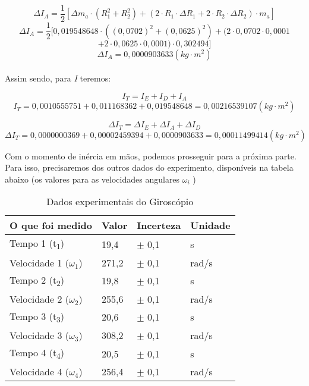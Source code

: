 \[\Delta I_A = \frac{1}{2} 
    \left[ 
        \Delta m_a \cdot (R_1^2 + R_2^2) + 
        \left( 2 \cdot R_1 \cdot \Delta R_1 + 2 \cdot R_2 \cdot \Delta R_2 \right) \cdot m_a
    \right]
\]
\[\Delta I_A = \frac{1}{2} 
    [ 
        0,019548648 \cdot ((0,0702)^2 + (0,0625)^2) + 
        (2 \cdot 0,0702 \cdot 0,0001 
\]\[
        + 2 \cdot 0,0625 \cdot 0,0001) \cdot 0,302494
    ]
\]
\[\Delta I_A = 0,0000903633 (kg \cdot m^2)\]\\

Assim sendo, para \textit{I} teremos:

\[I_T = I_E + I_D + I_A\]
\[I_T = 0,0010555751 + 0,011168362 + 0,019548648 = 0,00216539107 (kg \cdot m^2)\]

\[\Delta I_T = \Delta I_E + \Delta I_A + \Delta I_D\]
\[\Delta I_T = 0,0000000369 + 0,00002459394 + 0,0000903633 = 0,00011499414 (kg \cdot m^2)\]

Com o momento de inércia em mãos, podemos prosseguir para a próxima parte. Para isso, precisaremos dos outros dados do experimento, disponíveis na tabela abaixo (os valores para as velocidades angulares $\omega _i$ )

\begin{table}[H]
    \centering
    \begin{tabular}{ |M{5cm}||M{2cm}||M{2cm}||M{2cm}|  }
        \hline
        \textbf{O que foi medido} & \textbf{Valor} & \textbf{Incerteza} & \textbf{Unidade}\\
        \hline
        Tempo 1 (t\textsubscript{1})        & 19,4      & $\pm$ 0,1     & s\\
        Velocidade 1 ($\omega _1$)          & 271,2     & $\pm$ 0,1     & rad/s\\
        \hline
        Tempo 2 (t\textsubscript{2})        & 19,8      & $\pm$ 0,1     & s\\
        Velocidade 2 ($\omega _2$)          & 255,6     & $\pm$ 0,1     & rad/s\\
        \hline
        Tempo 3 (t\textsubscript{3})        & 20,6      & $\pm$ 0,1     & s\\
        Velocidade 3 ($\omega _3$)          & 308,2     & $\pm$ 0,1     & rad/s\\
        \hline
        Tempo 4 (t\textsubscript{4})        & 20,5      & $\pm$ 0,1     & s\\
        Velocidade 4 ($\omega _4$)          & 256,4     & $\pm$ 0,1     & rad/s\\
        \hline
    \end{tabular}
    \caption{Dados experimentais do Giroscópio}
\end{table}


